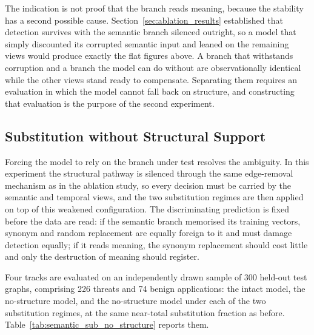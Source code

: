 \documentclass[%
    BCOR=10mm,
    DIV=13,
    toc=bibliography,
    toc=listof,
    oneside,
    12pt,
]{scrbook}
\begin{document}
The indication is not proof that the branch reads meaning, because the
stability has a second possible cause.
Section~\ref{sec:ablation_results} established that detection survives with
the semantic branch silenced outright, so a model that simply discounted its
corrupted semantic input and leaned on the remaining views would produce
exactly the flat figures above. A branch that withstands corruption and a
branch the model can do without are observationally identical while the other
views stand ready to compensate. Separating them requires an evaluation in
which the model cannot fall back on structure, and constructing that
evaluation is the purpose of the second experiment.

\subsection{Substitution without Structural Support}
\label{subsec:semantic_sub_no_structure}

Forcing the model to rely on the branch under test resolves the ambiguity.
In this experiment the structural pathway is silenced through the same
edge-removal mechanism as in the ablation study, so every decision must be
carried by the semantic and temporal views, and the two substitution regimes
are then applied on top of this weakened configuration. The discriminating
prediction is fixed before the data are read: if the semantic branch
memorised its training vectors, synonym and random replacement are equally
foreign to it and must damage detection equally; if it reads meaning, the
synonym replacement should cost little and only the destruction of meaning
should register.

Four tracks are evaluated on an independently drawn sample of 300 held-out test
graphs, comprising 226 threats and 74 benign applications: the intact model, the no-structure model, and the
no-structure model under each of the two substitution regimes, at the same
near-total substitution fraction as before.
Table~\ref{tab:semantic_sub_no_structure} reports them.
\end{document}
